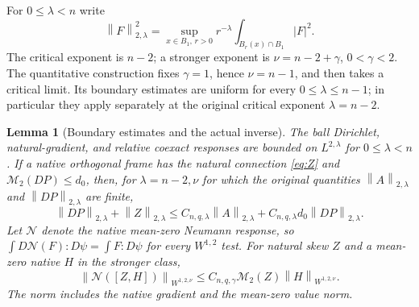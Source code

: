 \documentclass[11pt,a4paper]{article}
\numberwithin{equation}{section}
\newtheorem{lemma}[theorem]{Lemma}
\theoremstyle{definition}
\theoremstyle{remark}
\newcommand{\M}{\mathcal M}
\newcommand{\norm}[1]{\left\lVert#1\right\rVert}
\begin{document}
For $0\leq\lambda<n$ write
\[
 \norm F_{2,\lambda}^2=
 \sup_{x\in B_1,\,r>0}r^{-\lambda}
                         \int_{B_r(x)\cap B_1}|F|^2.
\]
The critical exponent is $n-2$; a stronger exponent is
$\nu=n-2+\gamma$, $0<\gamma<2$. The quantitative construction fixes
$\gamma=1$, hence $\nu=n-1$, and then takes a critical limit.
Its boundary estimates are uniform for every $0\leq\lambda\leq n-1$;
in particular they apply separately at the original critical exponent
$\lambda=n-2$.

\begin{lemma}[Boundary estimates and the actual inverse]\label{lem:gauge-operators}
The ball Dirichlet, natural-gradient, and relative coexact responses are
bounded on $L^{2,\lambda}$ for $0\leq\lambda<n$.
If a native orthogonal frame has the natural connection \eqref{eq:Z}
and $\M_2(DP)\leq d_0$, then, for $\lambda=n-2,\nu$ for which
the original quantities $\norm A_{2,\lambda}$ and
$\norm{DP}_{2,\lambda}$ are finite,
\begin{equation}\label{eq:absorption-before}
 \norm{DP}_{2,\lambda}+\norm Z_{2,\lambda}
 \leq C_{n,q,\lambda}\norm A_{2,\lambda}
       +C_{n,q,\lambda}d_0\norm{DP}_{2,\lambda}.
\end{equation}
Let $\mathcal N$ denote the native mean-zero Neumann response, so
$\int D\mathcal N(F):D\psi=\int F:D\psi$ for every $W^{1,2}$ test.
For natural skew $Z$ and a mean-zero native $H$ in the stronger class,
\begin{equation}\label{eq:linearized-neumann}
 \norm{\mathcal N([Z,H])}_{W^{1,2,\nu}}
 \leq C_{n,q,\gamma}\M_2(Z)\norm H_{W^{1,2,\nu}}.
\end{equation}
The norm includes the native gradient and the mean-zero value norm.
\end{lemma}
\end{document}
